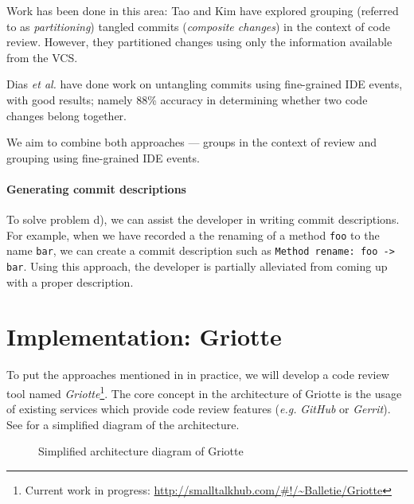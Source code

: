 \documentclass[conference,a4paper]{IEEEtran}
\newcommand{\code}[1]{\texttt{#1}}
\begin{document}
Work has been done in this area: Tao and Kim\cite{Tao15a} have
explored grouping (referred to as \textit{partitioning}) tangled
commits (\textit{composite changes}) in the context of code
review. However, they partitioned changes using only the information
available from the VCS.

Dias \textit{et al.}\cite{Dias15a} have done work on untangling
commits using fine-grained IDE events, with good results; namely 88\%
accuracy in determining whether two code changes belong together.

We aim to combine both approaches --- groups in the context of review
and grouping using fine-grained IDE events.

\paragraph{Generating commit descriptions}

To solve problem d), we can assist the developer in writing commit
descriptions. For example, when we have recorded a the renaming of a
method \code{foo} to the name \code{bar}, we can create a commit
description such as \code{Method rename: foo -> bar}. Using this
approach, the developer is partially alleviated from coming up with a
proper description.

\section{Implementation: Griotte}
\label{sec:impl-griotte}

To put the approaches mentioned in  in
practice, we will develop a code review tool named
\textit{Griotte}\footnote{Current work in progress:
  \url{http://smalltalkhub.com/#!/~Balletie/Griotte}}. The core
concept in the architecture of Griotte is the usage of existing
services which provide code review features (\textit{e.g.}
\textit{GitHub} or \textit{Gerrit}). See  for a
simplified diagram of the architecture.
\begin{figure}[t]
  \caption{Simplified architecture diagram of Griotte}
  \label{fig:diagram}
\end{figure}
\end{document}
